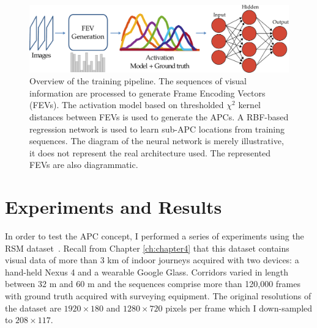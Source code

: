 \begin{figure}[h]
\centering
\includegraphics[width=\linewidth]{gfx/Chapter05/nn_pipelineFEV.pdf}
\caption{Overview of the training pipeline. The sequences of visual information are processed to generate Frame Encoding Vectors (FEVs). The activation model based on thresholded $\chi^2$ kernel distances between FEVs is used to generate the APCs. A RBF-based regression network is used to learn sub-APC locations from training sequences. The diagram of the neural network is merely illustrative, it does not represent the real architecture used. The represented FEVs are also diagrammatic.}
\label{fig:pipeline}
\end{figure}




\section{Experiments and Results}
\label{sec:ch5experiments}

In order to test the APC concept, I performed a series of experiments using the RSM dataset~\cite{RiveraWearable}. Recall from Chapter \ref{ch:chapter4} that this dataset contains visual data of more than 3 km of indoor journeys acquired with two devices: a hand-held Nexus 4 and a wearable Google Glass. Corridors varied in length between 32 m and 60 m and the sequences comprise more than 120,000 frames with ground truth acquired with surveying equipment. The original resolutions of the dataset are $1920\times 180$  and $1280 \times 720$ pixels per frame which I down-sampled to $208 \times 117$. 



